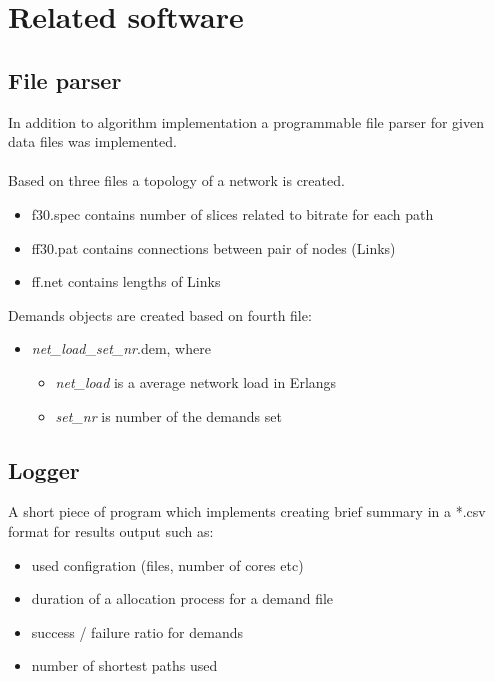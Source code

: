\documentclass[conference]{IEEEtran}
\begin{document}
\section{Related software}
\subsection{File parser}
In addition to algorithm implementation a programmable file parser for given data files was implemented.
\\ \\
Based on three files a topology of a network is created. 
\begin{itemize}
\item f30.spec contains number of slices related to bitrate for each path
\item ff30.pat contains connections between pair of nodes (Links)
\item ff.net contains lengths of Links 
\end{itemize}

\noindent Demands objects are created based on fourth file:
\begin{itemize}
\item \textit{net\_load}\_\textit{set\_nr}.dem, where
\begin{itemize}
\item \textit{net\_load} is a average network load in Erlangs
\item \textit{set\_nr} is number of the demands set
\end{itemize}
\end{itemize}

\subsection{Logger}
A short piece of program which implements creating brief summary in a *.csv format for results output such as:
\begin{itemize}
\item used configration (files, number of cores etc)
\item duration of a allocation process for a demand file
\item success / failure ratio for demands
\item number of shortest paths used
\end{itemize}
\end{document}
